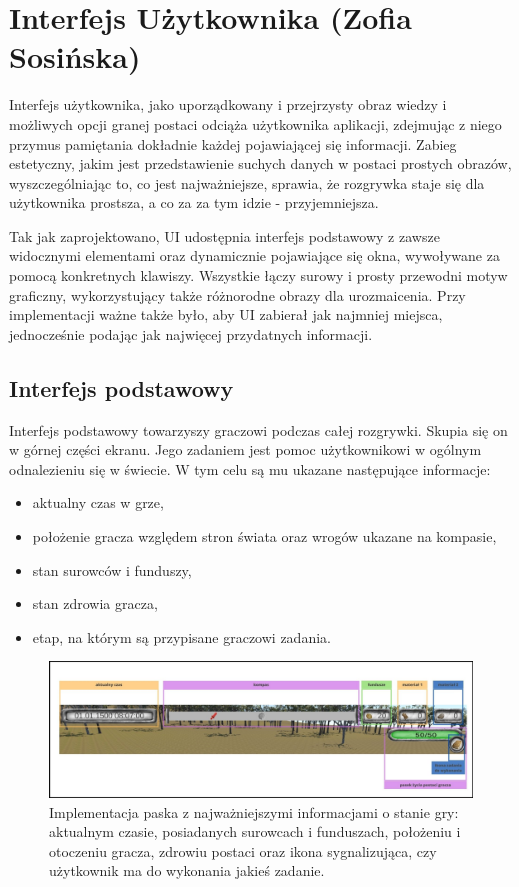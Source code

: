 \section{Interfejs Użytkownika (Zofia Sosińska)}\label{chap:ui_imp}
Interfejs użytkownika, jako uporządkowany i przejrzysty obraz wiedzy i możliwych opcji granej postaci odciąża użytkownika
aplikacji, zdejmując z niego przymus pamiętania dokładnie każdej pojawiającej się informacji. Zabieg estetyczny, jakim jest
przedstawienie suchych danych w postaci prostych obrazów, wyszczególniając to, co jest najważniejsze, sprawia, 
że rozgrywka staje się dla użytkownika prostsza, a co za za tym idzie - przyjemniejsza.

Tak jak zaprojektowano, UI udostępnia interfejs podstawowy z zawsze widocznymi elementami oraz dynamicznie pojawiające się okna, wywoływane za pomocą konkretnych klawiszy.
Wszystkie łączy surowy i prosty przewodni motyw graficzny, wykorzystujący także różnorodne obrazy dla urozmaicenia. Przy implementacji ważne także było, aby UI zabierał
jak najmniej miejsca, jednocześnie podając jak najwięcej przydatnych informacji.

\subsection{Interfejs podstawowy}
Interfejs podstawowy towarzyszy graczowi podczas całej rozgrywki. Skupia się on w górnej części ekranu. Jego zadaniem jest pomoc 
użytkownikowi w ogólnym odnalezieniu się w świecie. W tym celu są mu ukazane następujące informacje:
\begin{itemize}
    \item aktualny czas w grze,
    \item położenie gracza względem stron świata oraz wrogów ukazane na kompasie,
    \item stan surowców i funduszy,
    \item stan zdrowia gracza,
    \item etap, na którym są przypisane graczowi zadania.
\end{itemize}

\begin{figure}[htbp]
    \centering
    \includegraphics[width=1.0\textwidth]{images/ui/naszpasek.png}
    \caption{Implementacja paska z najważniejszymi informacjami o stanie gry: aktualnym czasie, posiadanych surowcach 
    i funduszach, położeniu i otoczeniu gracza, zdrowiu postaci oraz ikona sygnalizująca, czy użytkownik ma do wykonania jakieś zadanie.
    }\label{fig:naszpasek}
\end{figure}
\FloatBarrier

